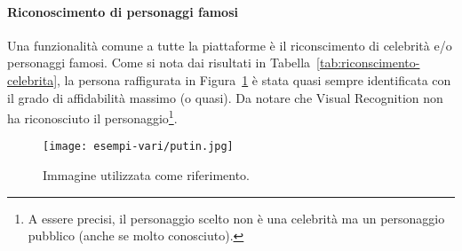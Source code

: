 \paragraph{Riconoscimento di personaggi famosi}\label{par:riconscimento-celebrita}
Una funzionalità comune a tutte la piattaforme è il riconscimento di celebrità e/o personaggi famosi.
Come si nota dai risultati in Tabella~\ref{tab:riconscimento-celebrita}, la persona raffigurata in Figura~\ref{fig:riconscimento-celebrita}
è stata quasi sempre identificata con il grado di affidabilità massimo (o quasi).
Da notare che Visual Recognition non ha riconosciuto il personaggio\footnote{A essere precisi, il personaggio scelto non è una celebrità
ma un personaggio pubblico (anche se molto conosciuto).}.
\begin{figure}[!h]
\begin{center}
	\texttt{[image: esempi-vari/putin.jpg]}
{\scriptsize \caption{Immagine utilizzata come riferimento.}
\label{fig:riconscimento-celebrita}}
\end{center}
\end{figure}
%
\begin{table}[!h]
\centering
{\footnotesize
{}
\caption{Tabella riassuntiva per il riconscimento di personaggi famosi.}
\label{tab:riconscimento-celebrita}}
\end{table}
%
